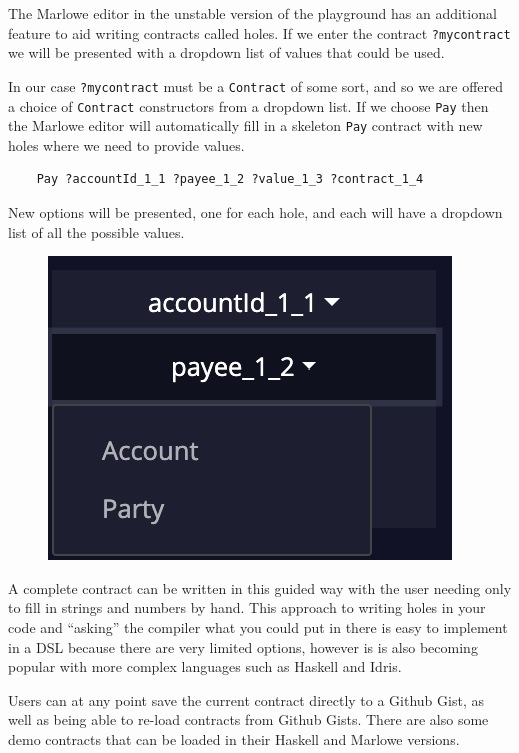 \documentclass[runningheads]{llncs}
\renewcommand{\lstinline}[1]{\texttt{#1}}
\begin{document}
The Marlowe editor in the unstable version of the playground has an additional feature to aid writing contracts called holes. If we enter the contract \lstinline{?mycontract}
we will be presented with a dropdown list of values that could be used.

In our case \lstinline{?mycontract} must be a \lstinline{Contract} of some sort, and so we are offered a choice of \lstinline{Contract} constructors from a dropdown list. If we choose \lstinline{Pay} then the Marlowe editor will automatically fill in a skeleton \lstinline{Pay} contract with new holes where we need to provide values.
\begin{verbatim}
    Pay ?accountId_1_1 ?payee_1_2 ?value_1_3 ?contract_1_4
\end{verbatim}
New options will be presented, one for each hole, and each will have a dropdown list of all the possible values.

\begin{figure}
    \vspace*{-0.3in}
    \includegraphics[scale=0.2]{hole_options_2.png}
\end{figure}
A complete contract can be written in this guided way with the user needing only to fill in strings and numbers by hand. This approach to writing holes in your code and ``asking'' the compiler what you could put in there is easy to implement in a DSL because there are very limited options, however is is also becoming popular with more complex languages such as Haskell and Idris.

Users can at any point save the current contract directly to a Github Gist, as well as being able to re-load contracts from Github Gists. There are also some demo contracts that can be loaded in their Haskell and Marlowe versions.
\end{document}
